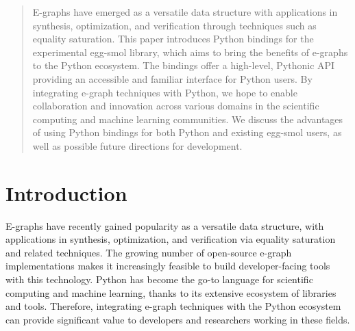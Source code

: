 \documentclass[sigplan,screen,review]{acmart}
\begin{document}



\begin{abstract}
E-graphs have emerged as a versatile data structure with applications in synthesis, optimization, and verification through techniques such as equality saturation. This paper introduces Python bindings for the experimental egg-smol library, which aims to bring the benefits of e-graphs to the Python ecosystem. The bindings offer a high-level, Pythonic API providing an accessible and familiar interface for Python users. By integrating e-graph techniques with Python, we hope to enable collaboration and innovation across various domains in the scientific computing and machine learning communities. We discuss the advantages of using Python bindings for both Python and existing egg-smol users, as well as possible future directions for development.

\end{abstract}


\maketitle

\section{Introduction}
E-graphs have recently gained popularity as a versatile data structure, with applications in synthesis, optimization, and verification via equality saturation and related techniques. The growing number of open-source e-graph implementations makes it increasingly feasible to build developer-facing tools with this technology. Python has become the go-to language for scientific computing and machine learning, thanks to its extensive ecosystem of libraries and tools. Therefore, integrating e-graph techniques with the Python ecosystem can provide significant value to developers and researchers working in these fields.
\end{document}
